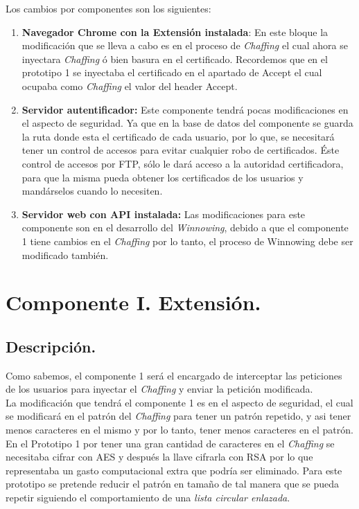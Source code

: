 \documentclass[12pt, a4paper, titlepage]{report}
\begin{document}
	            Los cambios por componentes son los siguientes:
	            \begin{enumerate}
	                \item \textbf{Navegador Chrome con la Extensi\'on instalada}: En este bloque la modificación que se lleva a cabo es en el proceso de \textit{Chaffing} el cual ahora se inyectara \textit{Chaffing} ó bien basura en el certificado. Recordemos que en el prototipo 1 se inyectaba el certificado en el apartado de Accept el cual ocupaba como \textit{Chaffing} el valor del header Accept.
	                
	                
	                \item \textbf{Servidor autentificador:} Este componente tendrá pocas modificaciones en el aspecto de seguridad. Ya que en la base de datos del componente se guarda la ruta donde esta el certificado de cada usuario, por lo que, se necesitará tener un control de accesos para evitar cualquier robo de certificados. Éste control de accesos por FTP, sólo le dará acceso a la autoridad certificadora, para que la misma pueda obtener los certificados de los usuarios y mandárselos cuando lo necesiten.
	                
	                \item \textbf{Servidor web con API instalada:} Las modificaciones para este componente son en el desarrollo del \textit{Winnowing}, debido a que el componente 1 tiene cambios en el \textit{Chaffing} por lo tanto, el proceso de Winnowing debe ser modificado también.
	            \end{enumerate}
    
		\section{Componente I. Extensión.}
		    \subsection{Descripción.}
		    
		        Como sabemos, el componente 1 será el encargado de interceptar las peticiones de los usuarios para inyectar el \textit{Chaffing} y enviar la petición modificada.\\
		        La modificación que tendrá el componente 1 es en el aspecto de seguridad, el cual se modificará en el patrón del \textit{Chaffing} para tener un patrón repetido, y asi tener menos caracteres en el mismo y por lo tanto, tener menos caracteres en el patrón. \\
		        En el Prototipo 1 por tener una gran cantidad de caracteres en el \textit{Chaffing} se necesitaba cifrar con AES y después la llave cifrarla con RSA por lo que representaba un gasto computacional extra que podría ser eliminado. Para este prototipo se pretende reducir el patrón en tamaño de tal manera que se pueda repetir siguiendo el comportamiento de una \textit{lista circular enlazada}.\\
		    
\end{document}
